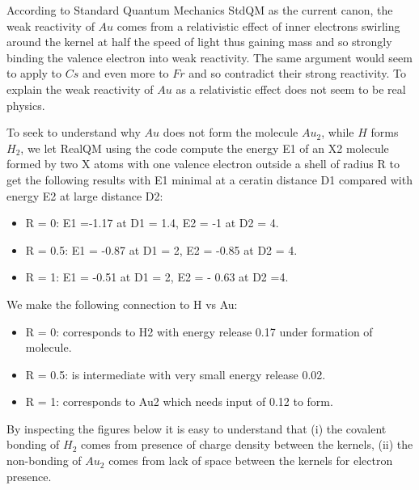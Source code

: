 \documentclass[11pt]{article} %
\begin{document}
According to Standard Quantum Mechanics StdQM as the current canon,  the weak reactivity of $Au$ comes from a relativistic effect of inner electrons swirling around the kernel at half the speed of light thus gaining mass and so strongly binding the valence electron into weak reactivity.  The same argument would seem to apply to $Cs$ and even more to $Fr$ and so contradict their strong reactivity.  To explain the weak reactivity of $Au$ as a relativistic effect does not seem to be real physics.


To seek to understand why $Au$ does not form the molecule $Au_2$,  while $H$ forms $H_2 $,  we let RealQM using the code \cite{Au2code} compute the energy E1 of an X2 molecule formed by two X atoms with one valence electron outside a shell of radius R to get the following results with E1 minimal at a ceratin distance D1 compared with energy E2 at large distance D2:

\begin{itemize}
\item R = 0:    E1 =-1.17  at   D1 = 1.4,       E2 = -1     at  D2 = 4.
\item R = 0.5: E1 = -0.87  at D1 = 2,         E2 = -0.85 at D2 = 4.
\item R = 1:     E1 = -0.51  at D1 = 2,          E2 = - 0.63 at D2 =4.
\end{itemize}
We make the following connection to H vs Au:
\begin{itemize}
\item R = 0:  corresponds to H2 with energy release 0.17 under formation of molecule.
\item R = 0.5:  is intermediate with very small energy release 0.02.
\item R = 1:  corresponds to Au2 which needs input of 0.12 to form.
\end{itemize} 
By inspecting the figures below it is easy to understand that (i) the covalent bonding of $H_2$ comes from presence of charge density between the kernels, (ii) the non-bonding of $Au_2$ comes from lack of space between the kernels for electron presence.
\end{document}
